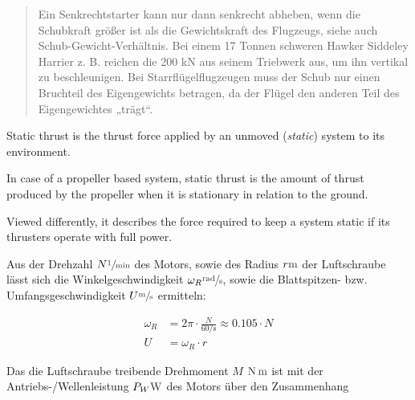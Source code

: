 \begin{quote}
Ein Senkrechtstarter kann nur dann senkrecht abheben, wenn die Schubkraft größer ist als die Gewichtskraft des Flugzeugs, siehe auch Schub-Gewicht-Verhältnis. Bei einem 17 Tonnen schweren Hawker Siddeley Harrier z. B. reichen die 200 kN aus seinem Triebwerk aus, um ihn vertikal zu beschleunigen. Bei Starrflügelflugzeugen muss der Schub nur einen Bruchteil des Eigengewichts betragen, da der Flügel den anderen Teil des Eigengewichtes „trägt“.
\end{quote}




Static thrust %
is the thrust force applied by an unmoved (\textit{static}) system to its environment.

In case of a propeller based system, static thrust is the amount of thrust 
produced by the propeller when it is stationary in relation to the ground.

Viewed differently, it describes the force required to keep a system static if its 
thrusters operate with full power. 



\bigbreak

Aus der Drehzahl 
$N \withunit{\per\minute}$ 
des Motors, sowie des Radius 
$r \withunit{\metre}$ 
der Luftschraube lässt sich die Winkelgeschwindigkeit 
$\omega_R \withunit{\radian\per\second}$, 
sowie die Blattspitzen- bzw. Umfangsgeschwindigkeit 
$U \withunit{\metre\per\second}$ 
ermitteln:

\begin{align}
	\omega_R &= 2\pi \cdot \frac{N}{60 \si{\per\second}} \approx 0.105 \cdot N \\
	U &= \omega_R \cdot r
\end{align}

\bigbreak

Das die Luftschraube treibende Drehmoment $M$ $\withunit{\newton\meter}$ ist mit der Antriebs-/Wellenleistung $P_W \withunit{\watt}$ des Motors über den Zusammenhang

